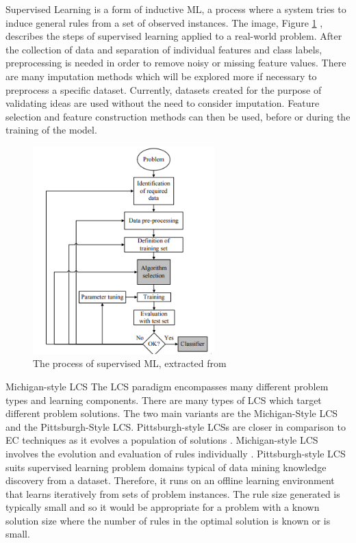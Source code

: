 Supervised Learning is a form of inductive ML, a process where a system tries to induce general rules from a set of observed instances. The image, Figure \ref{fig:supervisedLearning} \cite{kotsiantis2007supervised}, describes the steps of supervised learning applied to a real-world problem. After the collection of data and separation of individual features and class labels, preprocessing is needed in order to remove noisy or missing feature values. There are many imputation methods which will be explored more if necessary to preprocess a specific dataset. Currently, datasets created for the purpose of validating ideas are used without the need to consider imputation. Feature selection and feature construction methods can then be used, before or during the training of the model.

\begin{figure} [H]
	\begin{center}
		\includegraphics[width=70mm, scale=0.5]{supervisedLearning.png}
		\caption{ The process of supervised ML, extracted from \cite{kotsiantis2007supervised}}
		\label{fig:supervisedLearning}
	\end{center}
	
\end{figure}

Michigan-style LCS \label{subsec:mich}
The LCS paradigm encompasses many different problem types and learning components. There are many types of LCS which target different problem solutions. The two main variants are the Michigan-Style LCS and the Pittsburgh-Style LCS. Pittsburgh-style LCSs are closer in comparison to EC techniques as it evolves a population of solutions \cite{butz2010learning}. Michigan-style LCS involves the evolution and evaluation of rules individually \cite{butz2010learning}. Pittsburgh-style LCS suits supervised learning problem domains typical of data mining knowledge discovery from a dataset. Therefore, it runs on an offline learning environment that learns iteratively from sets of problem instances. The rule size generated is typically small and so it would be appropriate for a problem with a known solution size where the number of rules in the optimal solution is known or is small. 

